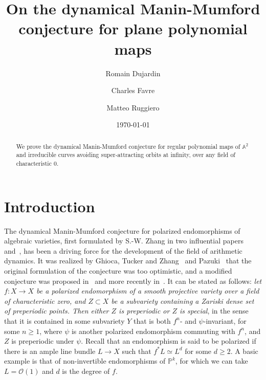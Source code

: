 \documentclass[11 pt, oneside, a4paper]{amsart}
\title[DMM conjecture for plane  polynomial maps]{On the dynamical Manin-Mumford conjecture for 
plane  polynomial maps}
\author{Romain Dujardin}
\author{Charles Favre}
\author{Matteo Ruggiero}
\date{\today}
\newcommand{\A}{\mathbb{A}}
\renewcommand{\P}{\mathbb{P}}
\theoremstyle{definition}
\theoremstyle{definition}
\begin{document}
 
 

\begin{abstract}
We prove the dynamical Manin-Mumford conjecture 
for regular polynomial maps of $\A^2$ and irreducible curves
avoiding super-attracting orbits at infinity, over any field of characteristic $0$. 
\end{abstract} 

 \maketitle
 

\setcounter{tocdepth}{1}
\tableofcontents

\section*{Introduction}

The dynamical Manin-Mumford conjecture for polarized endomorphisms of algebraic varieties, first 
formulated by S.-W. Zhang in two influential papers~\cite[Conjecture 2.5]{zhang:smallpointsadelicmetrics}
and~\cite[Conjecture 1.2.1]{zhang:distributions}, has been a driving force for the development of 
the field of arithmetic dynamics. It was realized by Ghioca, Tucker and Zhang~\cite{GTZ11} and 
Pazuki~\cite{pazuki} that the original formulation of the conjecture was too optimistic, 
and a modified conjecture was proposed in~\cite{GTZ11} and more recently in~\cite{GT21}. It can be 
 stated as follows: \emph{let 
$f:X\to X$ be a polarized endomorphism of a smooth projective variety over a field of characteristic zero, and $Z\subset X$ be a subvariety containing a Zariski dense set of preperiodic points. 
Then either $Z$ is preperiodic or $Z$ is special}, in the sense that it is contained in some 
subvariety $Y$ that is both $f^n$- and $\psi$-invariant, for some $n\geq 1$, 
where $\psi$ is another polarized endomorphism 
commuting with $f^n$, and $Z$ is preperiodic under $\psi$. Recall that an endomorphism is said to be polarized if there is an ample 
line bundle $L\to X$ such that $f^*L \simeq L^d$ for some $d\geq 2$. A basic  example is that 
of non-invertible endomorphisms of $\P^k$, for which we can take $L  = \mathcal O(1)$ and $d$ is the degree of $f$. 
\end{document}
